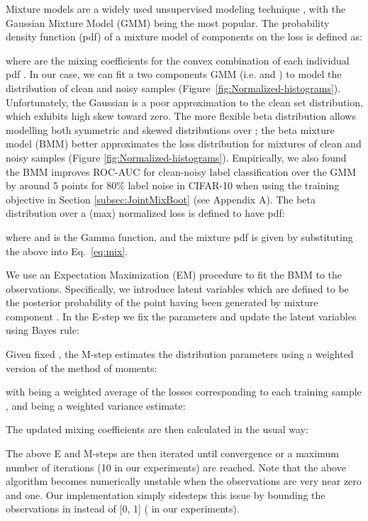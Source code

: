 \documentclass{article}
\begin{document}
Mixture models are a widely used unsupervised modeling technique
\cite{1999_GMM_BS,2006_PR_GMM_Imseg,2011_TPAMI_BMMestimation}, 
with the Gaussian Mixture Model (GMM) \cite{2006_PR_GMM_Imseg} being the most
popular. The probability density function (pdf) of a mixture model of
 components on the loss  is defined as: 

where  are the mixing coefficients for the convex combination
of each individual pdf . In our case,
we can fit a two components GMM (i.e.  and )
to model the distribution of clean and noisy samples
(Figure~\ref{fig:Normalized-histograms}). Unfortunately, the Gaussian
is a poor approximation to the clean set
distribution, which exhibits high skew toward zero. The more flexible beta distribution \cite{2011_TPAMI_BMMestimation} allows modelling both symmetric and skewed distributions over ; the beta mixture model (BMM) better approximates the loss distribution
for mixtures of clean and noisy samples (Figure \ref{fig:Normalized-histograms}). Empirically, we also found the BMM improves ROC-AUC for clean-noisy label classification over the GMM by around 5 points for 80\% label noise in CIFAR-10 when using the training objective in Section \ref{subsec:JointMixBoot} (see Appendix A).  The beta distribution over a (max) normalized loss 
is defined to have pdf:


where  and  is the Gamma
function, and the mixture pdf is given by substituting the above into Eq.~\eqref{eq:mix}.

We use an Expectation Maximization (EM) procedure to fit the BMM to
the observations. Specifically, we introduce latent variables 
which are defined to be the posterior probability of the point 
having been generated by mixture component . In the
E-step we fix the parameters 
and update the latent variables using Bayes rule: 

Given fixed , the M-step estimates
the distribution parameters  using
a weighted version of the method of moments: 

with  being a weighted average of the losses 
corresponding to each training sample ,
and  being a weighted variance estimate: 


The updated mixing coefficients  are then
calculated in the usual way: 

The above E and M-steps are then iterated until convergence or a maximum
number of iterations (10 in our experiments) are reached. Note that
the above algorithm becomes numerically unstable when the observations
are very near zero and one. Our implementation simply sidesteps this
issue by bounding the observations in 
instead of {[}0, 1{]} ( in our experiments).
\end{document}
